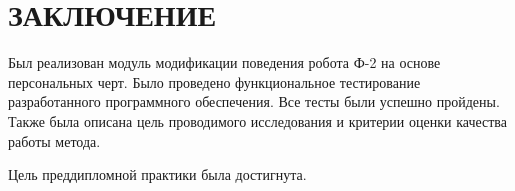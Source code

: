 \chapter*{ЗАКЛЮЧЕНИЕ}

Был реализован модуль модификации поведения робота Ф-2 на основе персональных черт.
Было проведено функциональное тестирование разработанного программного обеспечения.
Все тесты были успешно пройдены.
Также была описана цель проводимого исследования и критерии оценки качества работы метода.

Цель преддипломной практики была достигнута.

 